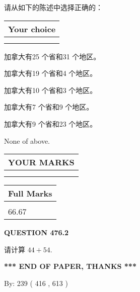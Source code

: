 \documentclass{ctexart}
\begin{document}
  
请从如下的陈述中选择正确的：
  
  
\noindent\hspace{3.0in} \begin{tabular}{|l|}
\hline
Your choice \\
\hline
 \\ 
 \\ 
\hline
\end{tabular}
  
  
 
 
加拿大有25 个省和31 个地区。
 
 
加拿大有19 个省和4 个地区。
 
 
加拿大有10 个省和3 个地区。
 
 
加拿大有7 个省和9 个地区。
 
 
加拿大有9 个省和23 个地区。
 
 
 None of above.
 
 
  
\vspace{0.2in}
  
\noindent\begin{tabular}{|l|}
\hline
 YOUR MARKS  \\
\hline
 \\ 
 \\ 
\hline
\end{tabular}
\hspace{0.05in} \begin{tabular}{|l|}
\hline
 Full Marks  \\
\hline
 \\ 
66.67 \\
\hline
\end{tabular}
{\textbf{\Large{QUESTION
476.2 
}}}
  
  
 
请计算 $ %
44 +  %
54 $.
 

 

 
   
   
 \vspace{0.2in}
 
   
   
   
   
\vspace{1.0in} 
{\textbf{\large{ *** END OF PAPER, THANKS *** }}} 
   
   
\hspace{1.0in} By: 
 239 ( 416 ,  613 )
   
\end{document}
